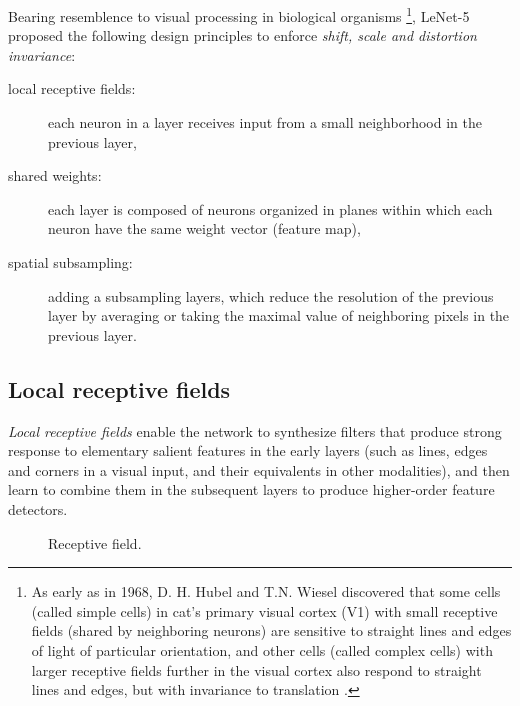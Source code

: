 \documentclass[11pt,czech,american,dvipsnames]{book}
\begin{document}
Bearing resemblence to visual processing in biological organisms \footnote{As early as in 1968, D. H. Hubel and T.N. Wiesel discovered that some cells (called simple cells) in cat's primary visual cortex (V1) with small receptive fields (shared by neighboring neurons) are sensitive to straight lines and edges of light of particular orientation, and other cells (called complex cells) with larger receptive fields further in the visual cortex also respond to straight lines and edges, but with invariance to translation \cite{Hubel1968}.}, LeNet-5 proposed the following design principles to enforce \emph{shift, scale and distortion invariance}: \cite{lecun1999}
\begin{description}
  \item[local receptive fields:] each neuron in a layer receives input from a small neighborhood in the previous layer,
  \item[shared weights:] each layer is composed of neurons organized in planes within which each neuron have the same weight vector (feature map),
  \item[spatial subsampling:] adding a subsampling layers, which reduce the resolution of the previous layer by averaging or taking the maximal value of neighboring pixels in the previous layer.
\end{description}

\subsection{Local receptive fields}
\emph{Local receptive fields} enable the network to synthesize filters that produce strong response to elementary salient features in the early layers (such as lines, edges and corners in a visual input, and their equivalents in other modalities), and then learn to combine them in the subsequent layers to produce higher-order feature detectors.

\begin{figure} 
\centering
\noindent{}
  \caption{Receptive field. \cite{goodfellow2016}}
\label{fig:receptive_field}
\end{figure}
\end{document}
